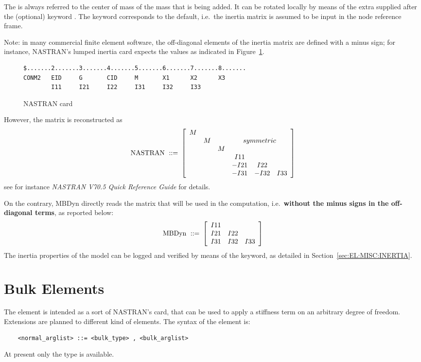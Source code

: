 The  is always referred to the center of mass of the
mass that is being added. It can be rotated locally by means of the extra
 supplied after the (optional) keyword .
The keyword  corresponds to the default, i.e.\ the inertia matrix
is assumed to be input in the node reference frame.

Note: in many commercial finite element software, the off-diagonal elements 
of the inertia matrix are defined with a minus sign; for instance, 
NASTRAN's  lumped inertia card expects the values as indicated
in Figure~\ref{fig:el:body:CONM2}.
%
\begin{figure}
\centering
\begin{minipage}{120mm}
\begin{verbatim}
$.......2.......3.......4.......5.......6.......7.......8.......
CONM2   EID     G       CID     M       X1      X2      X3
        I11     I21     I22     I31     I32     I33
\end{verbatim}
\end{minipage}
\caption{NASTRAN  card}
\label{fig:el:body:CONM2}
\end{figure}
%
However, the matrix is reconstructed as
\begin{displaymath}
	\mathrm{NASTRAN \ ::= } \ \sqbr{\matr{cccccc}{
		M & & & & & \\
		& M & & \multicolumn{3}{c}{symmetric} \\
		& & M & & & \\
		& & & I11 & & \\
		& & & -I21 & I22 & \\
		& & & -I31 & -I32 & I33
	}}
\end{displaymath}
see for instance \emph{NASTRAN V70.5 Quick Reference Guide} for details.

\noindent
On the contrary, MBDyn directly reads the matrix 
that will be used in the computation, i.e.\ 
\textbf{without the minus signs in the off-diagonal terms},
as reported below:
\begin{displaymath}
	\mathrm{MBDyn \ ::= } \ \sqbr{\matr{ccc}{
		I11 & & \\
		I21 & I22 & \\
		I31 & I32 & I33
	}}
\end{displaymath}
The inertia properties of the model can be logged and verified
by means of the  keyword, as detailed
in Section~\ref{sec:EL:MISC:INERTIA}.


\section{Bulk Elements}
The  element is intended as a sort of NASTRAN's  card,
that can be used to apply a stiffness term on an arbitrary degree of freedom.
Extensions are planned to different kind of elements.
The syntax of the  element is:
\begin{verbatim}
    <normal_arglist> ::= <bulk_type> , <bulk_arglist>
\end{verbatim}
At present only the  type is available.

